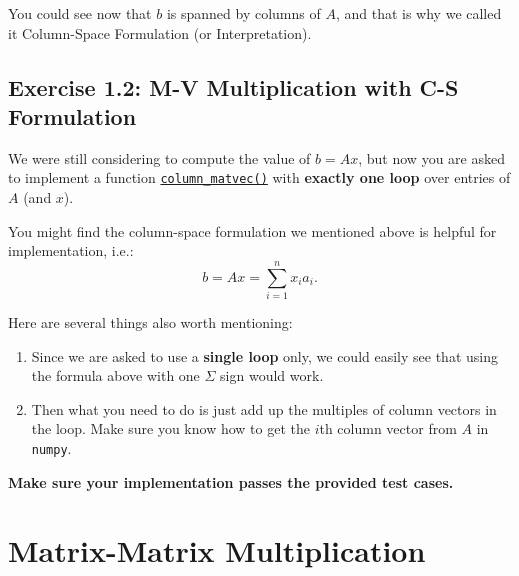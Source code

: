 \begin{note}
  You could see now that \(b\)  is spanned by columns of \(A\), and that is why we called it Column-Space Formulation (or Interpretation).
\end{note}

\subsection*{Exercise 1.2: M-V Multiplication with C-S Formulation}%
\begin{problem}
  We were still considering to compute the value of \(b = Ax\), but now you are asked to implement a function \href{https://comp-lin-alg.github.io/cla_utils.html#cla_utils.exercises1.column_matvec}{\texttt{column\_matvec()}} with \textbf{exactly one loop} over entries of \(A\) (and \(x\)).
\end{problem}
\noindent You might find the column-space formulation we mentioned above is helpful for implementation, i.e.:
\[
b = Ax =  \sum_{i=1}^{n} x_i a_i
.\]

\begin{hint} 
Here are several things also worth mentioning:

\begin{enumerate}
\item Since we are asked to use a \textbf{single loop} only, we could easily see that using the formula above with one $\Sigma$ sign would work. 
\item Then what you need to do is just add up the multiples of column vectors in the loop. Make sure you know how to get the \(i\)th column vector from \(A\)  in \texttt{numpy}. \checked
\end{enumerate}
\textbf{Make sure your implementation passes the provided test cases.}
\end{hint}

\section{Matrix-Matrix Multiplication}%
\label{sec1.3}
